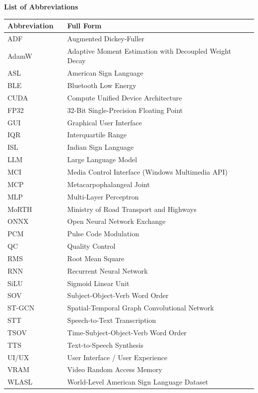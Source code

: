 \tableofcontents
\listoffigures
\listoftables

\clearpage
\begin{center}
{\Large\textbf{List of Abbreviations}}\\[10pt]
\end{center}
\begin{tabular}{@{}lll@{}}
\toprule
\textbf{Abbreviation} & & \textbf{Full Form} \\
\midrule
ADF      & & Augmented Dickey-Fuller \\
AdamW    & & Adaptive Moment Estimation with Decoupled Weight Decay \\
ASL      & & American Sign Language \\
BLE      & & Bluetooth Low Energy \\
CUDA     & & Compute Unified Device Architecture \\
FP32     & & 32-Bit Single-Precision Floating Point \\
GUI      & & Graphical User Interface \\
IQR      & & Interquartile Range \\
ISL      & & Indian Sign Language \\
LLM      & & Large Language Model \\
MCI      & & Media Control Interface (Windows Multimedia API) \\
MCP      & & Metacarpophalangeal Joint \\
MLP      & & Multi-Layer Perceptron \\
MoRTH    & & Ministry of Road Transport and Highways \\
ONNX     & & Open Neural Network Exchange \\
PCM      & & Pulse Code Modulation \\
QC       & & Quality Control \\
RMS      & & Root Mean Square \\
RNN      & & Recurrent Neural Network \\
SiLU     & & Sigmoid Linear Unit \\
SOV      & & Subject-Object-Verb Word Order \\
ST-GCN   & & Spatial-Temporal Graph Convolutional Network \\
STT      & & Speech-to-Text Transcription \\
TSOV     & & Time-Subject-Object-Verb Word Order \\
TTS      & & Text-to-Speech Synthesis \\
UI/UX    & & User Interface / User Experience \\
VRAM     & & Video Random Access Memory \\
WLASL    & & World-Level American Sign Language Dataset \\
\bottomrule
\end{tabular}

\clearpage
{}

